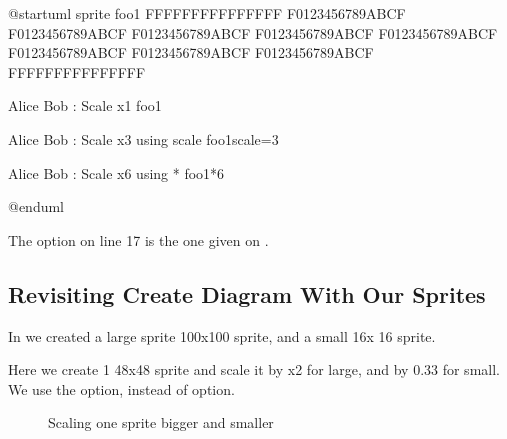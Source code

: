 \documentclass[letterpaper,10pt,english]{sphinxmanual}
\begin{document}
%
\begin{sphinxVerbatim}[commandchars=\\\{\},numbers=left,firstnumber=1,stepnumber=1]
@startuml
sprite \PYGZdl{}foo1 \PYGZob{}
FFFFFFFFFFFFFFF
F0123456789ABCF
F0123456789ABCF
F0123456789ABCF
F0123456789ABCF
F0123456789ABCF
F0123456789ABCF
F0123456789ABCF
F0123456789ABCF
FFFFFFFFFFFFFFF
\PYGZcb{}

Alice \PYGZhy{}\PYGZgt{} Bob : Scale x1 \PYGZlt{}\PYGZdl{}foo1\PYGZgt{}

Alice \PYGZhy{}\PYGZgt{} Bob : Scale x3 using scale \PYGZlt{}\PYGZdl{}foo1\PYGZob{}scale=3\PYGZcb{}\PYGZgt{}

Alice \PYGZhy{}\PYGZgt{} Bob : Scale x6 using * \PYGZlt{}\PYGZdl{}foo1*6\PYGZgt{}

@enduml
\end{sphinxVerbatim}
\sphinxresetverbatimhllines

The option on line 17 is the one given on .


\subsection{Revisiting Create Diagram With Our Sprites}
\label{\detokenize{scale/scale:revisiting-scalebigsmall-label}}
In {\hyperref[\detokenize{PlantUMLSpriteLibraries/plantuml_sprites:scalebigsmall-label}]{}} we created a large sprite 100x100 sprite, and a small 16x
16 sprite.

Here we create 1 48x48 sprite and scale it by x2 for large, and by 0.33 for small.
We use the  option, instead of  option.

\begin{figure}[htbp]
\centering
\capstart

\caption{Scaling one sprite bigger and smaller}\label{\detokenize{scale/scale:id2}}\end{figure}
\end{document}

